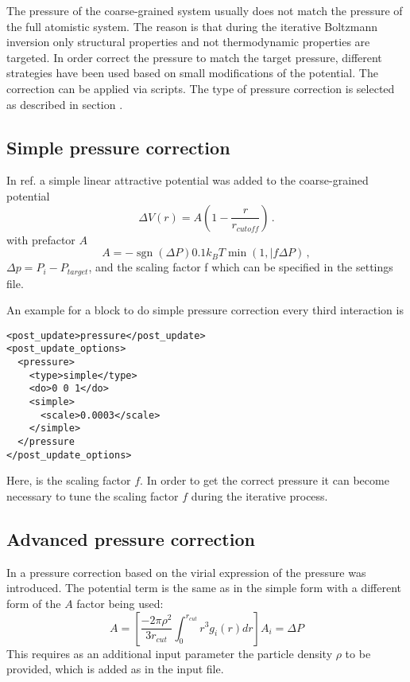 The pressure of the coarse-grained system usually does not match the pressure of the full atomistic system. The reason is that during the iterative Boltzmann inversion only structural properties and not thermodynamic properties are targeted. In order correct the pressure to match the target pressure, different strategies have been used based on small modifications of the potential. The correction can be applied via  scripts. The type of pressure correction is selected as described in section .


\subsection{Simple pressure correction}
In ref.\cite{Reith:2003} a simple linear attractive potential was added to the coarse-grained potential
\begin{equation}
  \Delta V(r)=A(1-\frac{r}{r_{cutoff}}) \,.
\end{equation}
with prefactor $A$
\begin{equation}
  A = -\operatorname{sgn}(\Delta P)0.1k_{B}T\min(1,|f\Delta P) \,,
\end{equation}
$\Delta p=P_i-P_{target}$, and the scaling factor f which can be specified in the settings file.

An example for a block to do simple pressure correction every third interaction is
\begin{lstlisting}
<post_update>pressure</post_update>
<post_update_options>
  <pressure>
    <type>simple</type>
    <do>0 0 1</do>
    <simple>
      <scale>0.0003</scale>
    </simple>
  </pressure
</post_update_options>
\end{lstlisting}
Here,  is the scaling factor $f$. In order to get the correct pressure it can become necessary to tune the scaling factor $f$ during the iterative process.

\subsection{Advanced pressure correction}
In \cite{Wang:2009} a pressure correction based on the virial expression of the pressure was introduced. The potential term is the same as in the simple form with a different form of the $A$ factor being used:
\begin{equation}
  A = \left[\frac{-2\pi\rho^{2}}{3r_{cut}}\int_{0}^{r_{cut}}r^{3}g_{i}(r)dr\right]A_{i}=\Delta P
\end{equation}
This requires as an additional input parameter the particle density $ \rho $ to be provided, which is added as   in the input file.

